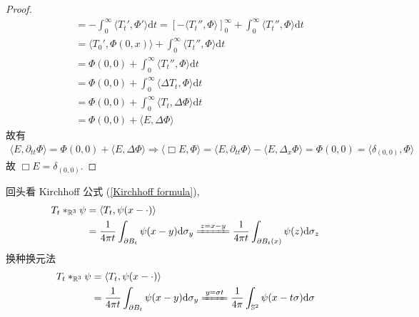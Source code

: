 \documentclass[11pt]{ctexart}[UTF8]
\begin{document}
\begin{proof}
\begin{equation*}
\begin{aligned}
                                                  &= -\int_{0}^{\infty} \langle T_{t}', \Phi' \rangle \mathrm{d}t = \left[- \langle T_{t}'',\Phi\rangle \right]_{0}^{\infty} + \int_{0}^{\infty} \langle T_{t}'', \Phi \rangle \mathrm{d}t\\
                                                  &= \langle T_{0}', \Phi(0,x) \rangle + \int_{0}^{\infty} \langle T_{t}'', \Phi \rangle \mathrm{d}t\\
                                                  &= \Phi(0,0) + \int_{0}^{\infty} \langle T_{t}'', \Phi \rangle \mathrm{d}t\\
                                                  &= \Phi(0,0) + \int_{0}^{\infty} \langle \Delta T_{t},  \Phi \rangle \mathrm{d}t\\
                                                  &= \Phi(0,0) + \int_{0}^{\infty} \langle T_{t}, \Delta \Phi \rangle \mathrm{d}t\\
                                                  &= \Phi(0,0) + \langle E, \Delta \Phi \rangle
        \end{aligned}
    \end{equation*}
    故有 
    \begin{equation*}
        \begin{aligned}
            \langle E, \partial_{tt} \Phi \rangle = \Phi(0,0) + \langle E, \Delta \Phi \rangle
            \Longrightarrow \langle \Box E, \Phi \rangle = \langle E, \partial_{tt} \Phi \rangle - \langle E, \Delta_{x} \Phi \rangle = \Phi(0,0) = \langle \delta_{(0,0)}, \Phi \rangle
        \end{aligned}
    \end{equation*}
    故 $\Box E = \delta_{(0,0)}$.
\end{proof}
回头看 Kirchhoff 公式 (\ref{Kirchhoff formula}), 
\begin{equation*}
    \begin{aligned}
        T_{t} \ast_{\mathbb{R}^{3}} \psi &= \langle T_{t}, \psi(x - \cdot) \rangle \\
                                         &= \frac{1}{4\pi t}\int_{\partial B_{t}}  \psi(x-y) \mathrm{d}\sigma_{y} \xlongequal{z=x-y} \frac{1}{4\pi t}\int_{\partial B_{t}(x)}  \psi(z) \mathrm{d}\sigma_{z}\\
    \end{aligned}
\end{equation*}
换种换元法
\begin{equation*}
    \begin{aligned}
        T_{t} \ast_{\mathbb{R}^{3}} \psi &= \langle T_{t}, \psi(x - \cdot) \rangle \\
                                         &= \frac{1}{4\pi t}\int_{\partial B_{t}}  \psi(x-y) \mathrm{d}\sigma_{y} \xlongequal{y = \sigma t} \frac{1}{4\pi}\int_{\mathbb{S}^{2}}  \psi(x - t\sigma) \mathrm{d}\sigma\\
    \end{aligned}
\end{equation*}
\end{document}
